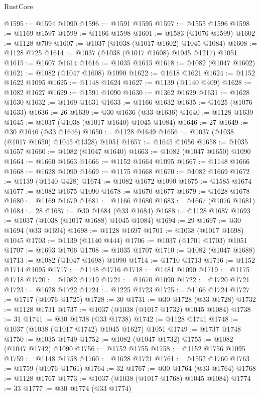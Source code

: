 \begin{lexlean}{RustCore}
\begin{coremodule}
@1595 := @1594 @1090
@1596 := @1591 @1595
@1597 := @1555 @1596
@1598 := @1169 @1597
@1599 := @1166 @1598
@1601 := @1583 (@1076 @1599)
@1602 := @1128 @709
@1607 := @1037 (@1038 (@1017 @1602) @1045 @1084)
@1608 := @1128 @725
@1614 := @1037 (@1038 (@1017 @1608) @1045 @1217) @1051
@1615 := @1607 @1614
@1616 := @1035 @1615
@1618 := @1082 (@1047 @1602)
@1621 := @1082 (@1047 @1608) @1090
@1622 := @1618 @1621
@1624 := @1152 @1622 @1095
@1625 := @1148 @1624
@1627 := @1139 (@1140 @409)
@1628 := @1082 @1627
@1629 := @1591 @1090
@1630 := @1362 @1629
@1631 := @1628 @1630
@1632 := @1169 @1631
@1633 := @1166 @1632
@1635 := @1625 (@1076 @1633)
@1636 := 26
@1639 := @30 @1636 (@33 @1636)
@1640 := @1128 @1639
@1645 := @1037 (@1038 (@1017 @1640) @1045 @1084)
@1646 := 27
@1649 := @30 @1646 (@33 @1646)
@1650 := @1128 @1649
@1656 := @1037 (@1038 (@1017 @1650) @1045 @1328) @1051
@1657 := @1645 @1656
@1658 := @1035 @1657
@1660 := @1082 (@1047 @1640)
@1663 := @1082 (@1047 @1650) @1090
@1664 := @1660 @1663
@1666 := @1152 @1664 @1095
@1667 := @1148 @1666
@1668 := @1628 @1090
@1669 := @1175 @1668
@1670 := @1082 @1669
@1672 := @1139 (@1140 @428)
@1674 := @1082 @1672 @1090
@1675 := @1585 @1674
@1677 := @1082 @1675 @1090
@1678 := @1670 @1677
@1679 := @1628 @1678
@1680 := @1169 @1679
@1681 := @1166 @1680
@1683 := @1667 (@1076 @1681)
@1684 := 28
@1687 := @30 @1684 (@33 @1684)
@1688 := @1128 @1687
@1693 := @1037 (@1038 (@1017 @1688) @1045 @1084)
@1694 := 29
@1697 := @30 @1694 (@33 @1694)
@1698 := @1128 @1697
@1701 := @1038 (@1017 @1698) @1045
@1703 := @1139 (@1140 @444)
@1706 := @1037 (@1701 @1703) @1051
@1707 := @1693 @1706
@1708 := @1035 @1707
@1710 := @1082 (@1047 @1688)
@1713 := @1082 (@1047 @1698) @1090
@1714 := @1710 @1713
@1716 := @1152 @1714 @1095
@1717 := @1148 @1716
@1718 := @1481 @1090
@1719 := @1175 @1718
@1720 := @1082 @1719
@1721 := @1670 @1090
@1722 := @1720 @1721
@1723 := @1628 @1722
@1724 := @1225 @1723
@1725 := @1166 @1724
@1727 := @1717 (@1076 @1725)
@1728 := 30
@1731 := @30 @1728 (@33 @1728)
@1732 := @1128 @1731
@1737 := @1037 (@1038 (@1017 @1732) @1045 @1084)
@1738 := 31
@1741 := @30 @1738 (@33 @1738)
@1742 := @1128 @1741
@1748 := @1037 (@1038 (@1017 @1742) @1045 @1627) @1051
@1749 := @1737 @1748
@1750 := @1035 @1749
@1752 := @1082 (@1047 @1732)
@1755 := @1082 (@1047 @1742) @1090
@1756 := @1752 @1755
@1758 := @1152 @1756 @1095
@1759 := @1148 @1758
@1760 := @1628 @1721
@1761 := @1552 @1760
@1763 := @1759 (@1076 @1761)
@1764 := 32
@1767 := @30 @1764 (@33 @1764)
@1768 := @1128 @1767
@1773 := @1037 (@1038 (@1017 @1768) @1045 @1084)
@1774 := 33
@1777 := @30 @1774 (@33 @1774)

\end{coremodule}
\end{lexlean}
